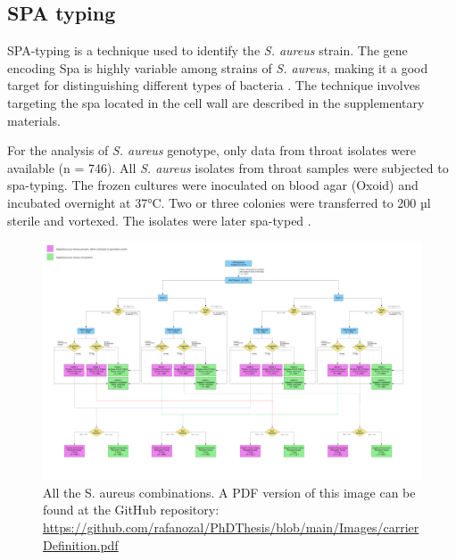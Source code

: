 \subsection{SPA typing}

SPA-typing is a technique used to identify the \textit{S. aureus} strain. The gene encoding Spa is highly variable among strains of \textit{S. aureus}, making it a good target for distinguishing different types of bacteria \cite{Hallin2009}. The technique involves targeting the \gls{spa} located in the cell wall are described in the supplementary materials.

For the analysis of \textit{S. aureus} genotype, only data from throat isolates were available (n = 746). All \textit{S. aureus} isolates from throat samples were subjected to spa-typing. The frozen cultures were inoculated on blood agar (Oxoid) and incubated overnight at 37°C. Two or three colonies were transferred to 200 µl sterile and vortexed. The isolates were later spa-typed \cite{Sangvik2011}.

\clearpage

            \begin{figure}[!ht]
                \centering
                    \includegraphics[width=1.2\linewidth, angle=90, origin=c]{figures/Methodology/carrierDefinition.png } 
                \caption{All the S. aureus combinations. A PDF version of this image can be found at the GitHub repository:  \url{https://github.com/rafanozal/PhDThesis/blob/main/Images/carrierDefinition.pdf}}
                
                \label{fig:Carrier_definition}
            \end{figure}

\clearpage

